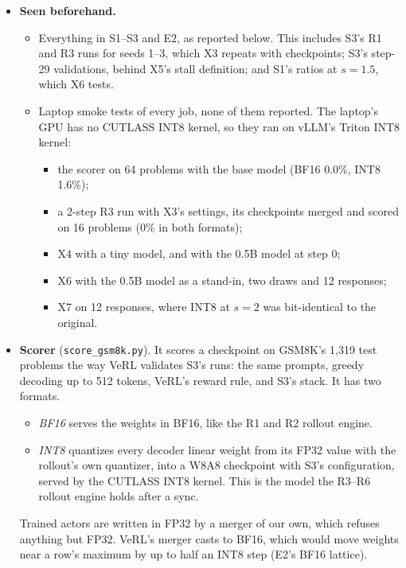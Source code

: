 \documentclass[11pt]{article}
\begin{document}
\begin{itemize}
\item \textbf{Seen beforehand.}
  \begin{itemize}
  \item Everything in S1--S3 and E2, as reported below. This includes S3's R1 and R3 runs for seeds 1--3, which X3 repeats with checkpoints; S3's step-29 validations, behind X5's stall definition; and S1's ratios at $s=1.5$, which X6 tests.
  \item Laptop smoke tests of every job, none of them reported. The laptop's GPU has no CUTLASS INT8 kernel, so they ran on vLLM's Triton INT8 kernel:
    \begin{itemize}
    \item the scorer on 64 problems with the base model (BF16 0.0\%, INT8 1.6\%);
    \item a 2-step R3 run with X3's settings, its checkpoints merged and scored on 16 problems (0\% in both formats);
    \item X4 with a tiny model, and with the 0.5B model at step 0;
    \item X6 with the 0.5B model as a stand-in, two draws and 12 responses;
    \item X7 on 12 responses, where INT8 at $s=2$ was bit-identical to the original.
    \end{itemize}
  \end{itemize}
\item \textbf{Scorer} (\texttt{score\_gsm8k.py}). It scores a checkpoint on GSM8K's 1{,}319 test problems the way VeRL validates S3's runs: the same prompts, greedy decoding up to 512 tokens, VeRL's reward rule, and S3's stack. It has two formats.
  \begin{itemize}
  \item \emph{BF16} serves the weights in BF16, like the R1 and R2 rollout engine.
  \item \emph{INT8} quantizes every decoder linear weight from its FP32 value with the rollout's own quantizer, into a W8A8 checkpoint with S3's configuration, served by the CUTLASS INT8 kernel. This is the model the R3--R6 rollout engine holds after a sync.
  \end{itemize}
  Trained actors are written in FP32 by a merger of our own, which refuses anything but FP32. VeRL's merger casts to BF16, which would move weights near a row's maximum by up to half an INT8 step (E2's BF16 lattice).
\end{itemize}
\end{document}
